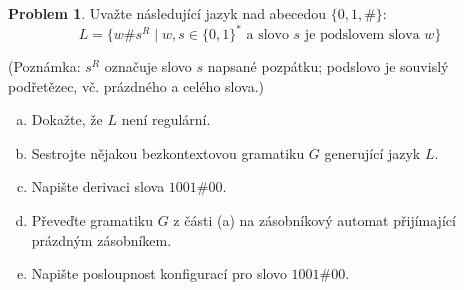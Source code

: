 \documentclass[a4paper,12pt]{article}
\theoremstyle{definition}
\newtheorem{problem}{Problem}
\begin{document}
\bigskip


\begin{problem}
    
    Uvažte následující jazyk nad abecedou $\{0,1,\#\}$:
    $$
    L = \{w \# s^R \mid w,s\in\{0,1\}^*\text{ a slovo $s$ je podslovem slova $w$}\}
    $$
    
    (Poznámka: $s^R$ označuje slovo $s$ napsané pozpátku; podslovo je souvislý podřetězec, vč. prázdného a celého slova.)

    \begin{enumerate}[(a)]  
        \item Dokažte, že $L$ není regulární.    
        \item Sestrojte nějakou bezkontextovou gramatiku $G$ generující jazyk $L$.
        \item Napište derivaci slova $1001\#00$.
        \item Převeďte gramatiku $G$ z části (a) na zásobníkový automat přijímající prázdným zásobníkem.
        \item Napište posloupnost konfigurací pro slovo $1001\#00$.
    \end{enumerate}

\end{problem}


\bigskip
\end{document}
